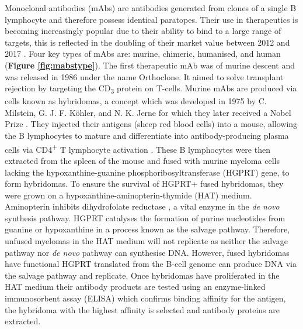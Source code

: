 Monoclonal antibodies (mAbs) are antibodies generated from clones of a single B lymphocyte and therefore possess identical paratopes. Their use in therapeutics is becoming increasingly popular due to their ability to bind to a large range of targets, this is reflected in the doubling of their market value between 2012 and 2017 \cite{griloIncreasinglyHumanProfitable2019}. Four key types of mAbs are: murine, chimeric, humanised, and human (\textbf{Figure \ref{fig:mabstype}}). The first therapeutic mAb was of murine descent and was released in 1986 \cite{eckerTherapeuticMonoclonalAntibody2014} under the name Orthoclone. It aimed to solve transplant rejection by targeting the CD\textsubscript{3} protein on T-cells. Murine mAbs are produced via cells known as hybridomas, a concept which was developed in 1975 by C. Milstein, G. J. F. K\"{o}hler, and N. K. Jerne for which they later received a Nobel Prize \cite{kohlerContinuousCulturesFused1975}. They injected their antigens (sheep red blood cells) into a mouse, allowing the B lymphocytes to mature and differentiate into antibody-producing plasma cells via CD4\textsuperscript{+} T lymphocyte activation \cite{breitfeldFollicularHelperCells2000}. These B lymphocytes were then extracted from the spleen of the mouse and fused with murine myeloma cells lacking the hypoxanthine-guanine phosphoribosyltransferase (HGPRT) gene, to form hybridomas. To ensure the survival of HGPRT+ fused hybridomas, they were grown on a hypoxanthine-aminopterin-thymide (HAT) medium. Aminopterin inhibits dihydrofolate reductase \cite{stoneInhibitionDihydrofolateReductase1984}, a vital enzyme in the \emph{de novo} synthesis pathway. HGPRT catalyses the formation of purine nucleotides from guanine or hypoxanthine in a process known as the salvage pathway. Therefore, unfused myelomas in the HAT medium will not replicate as neither the salvage pathway nor \emph{de novo} pathway can synthesise DNA. However, fused hybridomas have functional HGPRT translated from the B-cell genome can produce DNA via the salvage pathway and replicate. Once hybridomas have proliferated in the HAT medium their antibody products are tested using an enzyme-linked immunosorbent assay (ELISA) which confirms binding affinity for the antigen, the hybridoma with the highest affinity is selected and antibody proteins are extracted.
\\[24pt]

